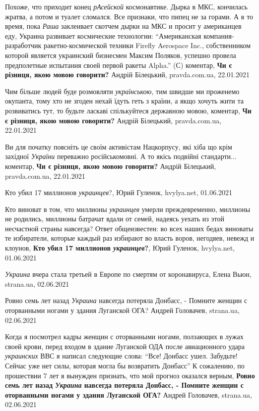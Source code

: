 Похоже, что приходит конец \emph{рАсейской} космонавтике. Дырка в МКС,
кончилась жратва, а потом и туалет сломался. Все признаки, что пипец не за
горами.  А в то время, пока \emph{Раша} заклеивает скотчем дырки на МКС и
просит у американцев еду, Украина развивает космические технологии:
\enquote{Американская компания-разработчик ракетно-космической техники Firefly
Aerospace Inc., собственником которой является украинский бизнесмен Максим
Поляков, успешно провела предполетные испытания своей первой ракеты Alpha.} (С)
коментар, \textbf{Чи є різниця, якою мовою говорити?} Андрій Білецький, pravda.com.ua, 22.01.2021

Чим більше людей буде розмовляти \emph{українською}, тим швидше ми проженемо окупанта,
тому хто не згоден нехай їдуть геть з країни, а якщо хочуть жити та розвиватись
тут, то будьте ласкаві спількуйтеся державною мовою,
коментар, \textbf{Чи є різниця, якою мовою говорити?} Андрій Білецький, pravda.com.ua, 22.01.2021

Ви для початку поясніть це своїм активістам Нацкорпусу, які хіба що крім
західної \emph{України} переважно російськомовні. А то якісь подвійні стандарти...
коментар, \textbf{Чи є різниця, якою мовою говорити?} Андрій Білецький, pravda.com.ua, 22.01.2021

Кто убил 17 миллионов \emph{украинцев}?, Юрий Гуленок, hvylya.net, 01.06.2021

Кто виноват в том, что миллионы \emph{украинцев} умерли преждевременно, миллионы не
родились, миллионы батрачат вдали от семей, надеясь уехать из этой несчастной
страны навсегда?  Ответ общеизвестен: во всех наших бедах виноваты те
избиратели, которые каждый раз избирают во власть воров, негодяев, невежд и
клоунов,
\textbf{Кто убил 17 миллионов \emph{украинцев}?}, Юрий Гуленок, hvylya.net, 01.06.2021

\emph{Украина} вчера стала третьей в Европе по смертям от коронавируса, Елена Вьюн, strana.ua, 02.06.2021

Ровно семь лет назад \emph{Украина} навсегда потеряла Донбасс, - Помните женщин с оторванными ногами у здания Луганской ОГА? 
Андрей Головачев, strana.ua, 02.06.2021

Когда я посмотрел кадры женщин с оторванными ногами, ползающих в лужах своей
крови, перед входом в здание Луганской ОДА после авиационного удара \emph{украинских}
ВВС я написал следующие слова: \enquote{Все! Донбасс ушел. Забудьте! Сейчас уже
нет силы, которая могла бы возвратить Донбасс} К сожалению, по прошествии 7 лет
я вынужден признать, что мой прогноз оказался верным,
\textbf{Ровно семь лет назад \emph{Украина} навсегда потеряла Донбасс, - Помните женщин с оторванными ногами у здания Луганской ОГА?} 
Андрей Головачев, strana.ua, 02.06.2021

